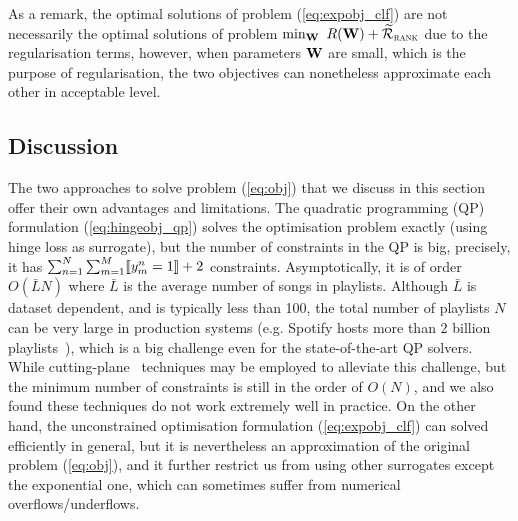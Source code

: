 As a remark, the optimal solutions of problem (\ref{eq:expobj_clf}) are not necessarily the optimal solutions 
of problem $\min_\W \ R(\W) + \widetilde\RCal_\textsc{rank}$ due to the regularisation terms,
however, when parameters $\mathbf{W}$ are small, which is the purpose of regularisation, the two objectives 
can nonetheless approximate each other in acceptable level.



\subsection{Discussion}

The two approaches to solve problem (\ref{eq:obj}) that we discuss in this section offer their own advantages and limitations.
The quadratic programming (QP) formulation (\ref{eq:hingeobj_qp}) solves the optimisation problem exactly (using hinge loss as surrogate),
but the number of constraints in the QP is big, precisely, it has $\sum_{n=1}^N \sum_{m=1}^M \llbracket y_m^n = 1 \rrbracket + 2$ constraints.
Asymptotically, it is of order $O(\bar{L} N)$ where $\bar{L}$ is the average number of songs in playlists. 
Although $\bar{L}$ is dataset dependent, and is typically less than 100, the total number of playlists $N$ can be very large 
in production systems (e.g. Spotify hosts more than $2$ billion playlists~\cite{recsysch2018}), 
which is a big challenge even for the state-of-the-art QP solvers.
While cutting-plane~\cite{avriel2003nonlinear} techniques may be employed to alleviate this challenge,
but the minimum number of constraints is still in the order of $O(N)$, and we also found these techniques do not work extremely well in practice.
On the other hand, the unconstrained optimisation formulation (\ref{eq:expobj_clf}) can solved efficiently in general, 
but it is nevertheless an approximation of the original problem (\ref{eq:obj}), and it further restrict us from using other surrogates
except the exponential one, which can sometimes suffer from numerical overflows/underflows.
